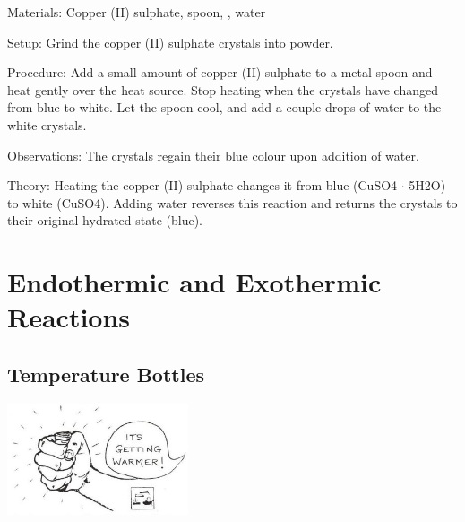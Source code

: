 \begin{multicols}{2}
\begin{description*}
\item[Materials:]{Copper (II) sulphate, spoon, , water}
\item[Setup:]{Grind the copper (II) sulphate crystals into powder.}
\item[Procedure:]{Add a small amount of copper (II) sulphate to a metal spoon and heat gently over the heat source. Stop heating when the crystals have changed from blue to white. Let the spoon cool, and add a couple drops of water to the white crystals.}
\item[Observations:]{The crystals regain their blue colour upon addition of water.}
\item[Theory:]{Heating the copper (II) sulphate changes it from blue (\ce CuSO4 $\cdot$ 5H2O) to white (\ce CuSO4). Adding water reverses this reaction and returns the crystals to their original hydrated state (blue).}
\end{description*}

\columnbreak


\section*{Endothermic and Exothermic Reactions}   


\subsection{Temperature Bottles}  %

\begin{center}
\includegraphics[width=0.4\textwidth]{./img/source/exothermic.jpg}
\end{center}


\end{multicols}
